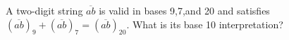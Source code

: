 A two-digit string $\overline{ab}$ is valid in bases 9,7,and 20 and satisfies $(\overline{ab})_9+(\overline{ab})_7=(\overline{ab})_{20}$. What is its base 10 interpretation?
